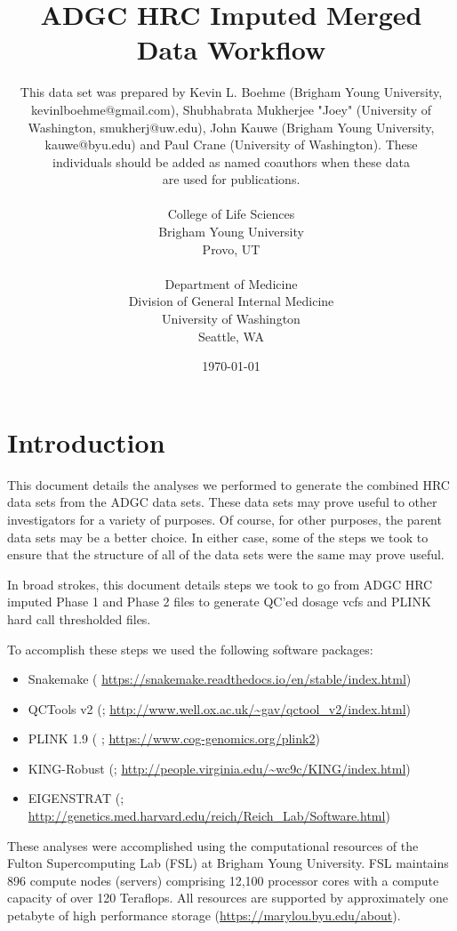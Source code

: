 \documentclass[12pt]{article}
\title{ADGC HRC Imputed Merged Data Workflow}
\author{This data set was prepared by Kevin L. Boehme (Brigham Young University, \\
kevinlboehme@gmail.com), Shubhabrata Mukherjee "Joey" (University of \\
Washington, smukherj@uw.edu), John Kauwe (Brigham Young University, \\
kauwe@byu.edu) and Paul Crane (University of Washington). These \\
individuals should be added as named coauthors when these data \\
are used for publications. \\
\\
\small College of Life Sciences \\
\small Brigham Young University \\
\small Provo, UT \\
\\
\small Department of Medicine\\
\small Division of General Internal Medicine \\
\small University of Washington\\
\small Seattle, WA}
\date{\today}
\begin{document}

\maketitle
\tableofcontents

\section{Introduction}
This document details the analyses we performed to generate the combined HRC data sets from the ADGC data sets. These data sets may prove useful to other investigators for a variety of purposes. Of course, for other purposes, the parent data sets may be a better choice. In either case, some of the steps we took to ensure that the structure of all of the data sets were the same may prove useful.

In broad strokes, this document details steps we took to go from ADGC HRC imputed Phase 1 and Phase 2 files to generate QC'ed dosage vcfs and PLINK hard call thresholded files.

To accomplish these steps we used the following software packages:

\begin{itemize}

\item Snakemake (\cite{koster2012snakemake} \url{https://snakemake.readthedocs.io/en/stable/index.html})

\item QCTools v2 (\cite{qctoolsv2}; \url{http://www.well.ox.ac.uk/~gav/qctool_v2/index.html})

\item PLINK 1.9 (\cite{plink2} \cite{purcell2007plink}; \url{https://www.cog-genomics.org/plink2})


\item KING-Robust (\cite{king}; \url{http://people.virginia.edu/~wc9c/KING/index.html})

\item EIGENSTRAT (\cite{price2006principal}; \url{http://genetics.med.harvard.edu/reich/Reich\_Lab/Software.html})

\end{itemize}

These analyses were accomplished using the computational resources of the Fulton Supercomputing Lab (FSL) at Brigham Young University. FSL maintains 896 compute nodes (servers) comprising 12,100 processor cores with a compute capacity of over 120 Teraflops. All resources are supported by approximately one petabyte of high performance storage (\url{https://marylou.byu.edu/about}).
\end{document}
